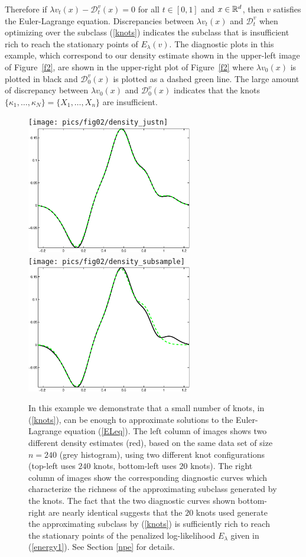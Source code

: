 \documentclass[noinfoline]{imsart}
\begin{document}
 Therefore if   $\lambda v_t(x)-\mathcal D_t^v(x) = 0$ for all $t\in [0,1]$ and $x\in \Bbb R^d$, then $v$ satisfies the Euler-Lagrange equation. Discrepancies between $\lambda v_t(x)$ and $\mathcal D_t^v$ when optimizing over the subclass (\ref{knots}) indicates the subclass that is insufficient rich to reach the stationary points of $E_\lambda(v)$. 
 The diagnostic plots in this example, which correspond to our density estimate shown in the upper-left image of Figure~\ref{f2},  are shown in the upper-right plot of Figure~\ref{f2} where $\lambda v_0(x)$ is plotted in  black and $\mathcal D_0^v(x)$ is plotted as a dashed green line. The large amount of discrepancy between $\lambda v_0(x)$  and $\mathcal D_0^v(x)$ indicates that the knots $\{\kappa_1,\ldots, \kappa_N\}=\{ X_1,\ldots,X_n\}$  are insufficient. 
 
 

\begin{figure}[t]
\centering
\texttt{[image: pics/fig02/density\_justn]}
\includegraphics[height = 2.2in]{pics/fig02/agreement0_justn}\\
\texttt{[image: pics/fig02/density\_subsample]}
\includegraphics[height = 2.2in]{pics/fig02/agreement0_subsample}
\caption{ 
 \label{f3} 
 In this example we demonstrate that a small number of knots, in (\ref{knots}), can be enough to approximate solutions to the  Euler-Lagrange equation (\ref{ELeq}). The left column of images shows two different density estimates (red), based on the same data set  of size $n=240$ (grey histogram), using two different knot configurations (top-left uses $240$ knots, bottom-left uses $20$ knots). The right column of images show the corresponding  diagnostic curves which characterize the richness of the approximating subclass generated by the knots. The fact that the two diagnostic curves shown bottom-right are nearly identical suggests that the $20$ knots  used generate the approximating subclass by (\ref{knots}) is sufficiently rich to reach the stationary points of the penalized log-likelihood $E_\lambda$ given in (\ref{energy1}).
See Section \ref{npe} for details.
 }
 \end{figure}
\end{document}
